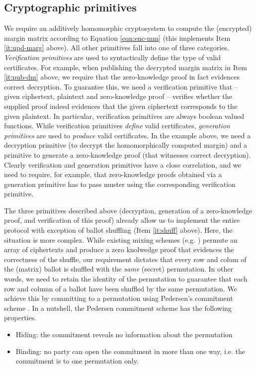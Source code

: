 \subsection{Cryptographic primitives}
We require an additively homomorphic cryptosystem to
compute the (encrypted) margin matrix according to Equation
\ref{eqn:enc-mm} (this implements Item \ref{it:upd-marg} above). All
other primitives fall into one of three categories.
\emph{Verification primitives} are used to syntactically define
the type of valid certificates. For example, when publishing the
decrypted margin matrix in Item \ref{it:pub-dm} above, we require
that the zero-knowledge proof in fact evidences correct decryption.
To
guarantee this, we need a verification primitive that -- given
ciphertext, plaintext and zero-knowledge proof -- verifies whether the supplied proof
indeed evidences that the given ciphertext corresponds to the given
plaintext. In particular, verification primitives are always boolean
valued functions. While verification primitives \emph{define} valid
certificates, \emph{generation primitives} are used to
\emph{produce} valid certificates. In the example above, we need a
decryption primitive (to decrypt the homomorphically computed
margin) and a primitive to generate a zero-knowledge proof (that
witnesses correct decryption). Clearly verification and generation
primitives have a close correlation, and we need to require, for
example, that zero-knowledge proofs obtained via a generation
primitive has to pass muster using the corresponding verification
primitive. 

The three primitives described above (decryption, generation of a
zero-knowledge proof, and verification of this proof) already allow
us  to implement the entire protocol with exception of ballot
shuffling (Item \ref{it:shuff} above).  Here, the situation is more
complex. While existing mixing schemes (e.g. \citep{Bayer:2012:EZK}) permute 
an array of ciphertexts and produce a zero knolwedge proof that
evidences the correctness of the shuffle, our requirement dictates
that every row and colum of the (matrix) ballot is
shuffled with the \emph{same} (secret) permutation.  In other words,
we need to retain the identity of the permutation to guarantee that
each row and column of a ballot have been shuffled by the same
permutation.
We achieve this by
committing to a permutation using Pedersen's commitment scheme
\citep{Pederson}.
In a nutshell, the Pedersen commitment scheme has the following properties. 
\begin{itemize}
\item Hiding: the commitment reveals no information about the
permutation
\item Binding: no party can open the commitment in more  
	 	than one way, i.e. the commitment is to one permutation only. 
\end{itemize}

